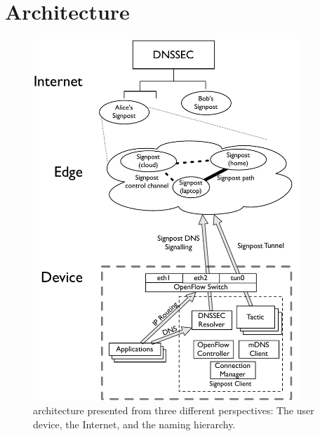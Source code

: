 \section{\signpost Architecture}\label{sec:signpost-architecture}

\begin{figure}
  \begin{center}
	\includegraphics[width=0.9\textwidth]{Chapter3/Chapter3Figs/signpost-arch}
  \end{center}
  \caption[\signpost architecture.]{\signpost architecture presented from three different
    perspectives: The user device, the Internet, and the naming hierarchy.}
  \label{fig:signpost-arch}
\end{figure}

